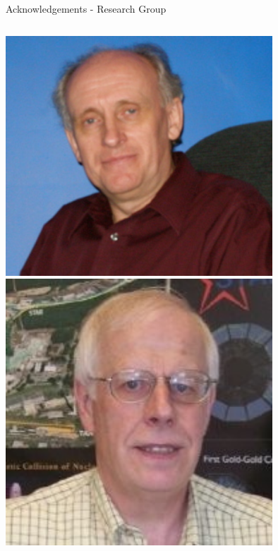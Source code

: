 \documentclass[aspectratio=169]{beamer}
\begin{document}
\begin{frame}{Acknowledgements - Research Group}
\begin{columns}
            \includegraphics[width=0.75\textwidth]{people/actual_mrg/doug.png}
            \includegraphics[width=0.75\textwidth]{people/actual_mrg/steve.png}


\end{columns}
\end{frame}
\end{document}

